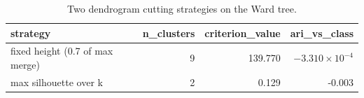 \begin{table}[htbp]
\centering
\begin{tabular}{lrrr}
\toprule
strategy & n\_clusters & criterion\_value & ari\_vs\_class \\
\midrule
fixed height (0.7 of max merge) & 9 & 139.770 & $-3.310\times 10^{-4}$ \\
max silhouette over k & 2 & 0.129 & -0.003 \\
\bottomrule
\end{tabular}
\caption{Two dendrogram cutting strategies on the Ward tree.}
\label{tab:cuts}
\end{table}
